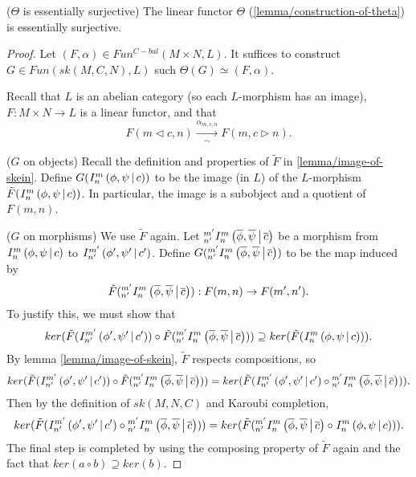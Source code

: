 \begin{lemma}\label{lemma/theta-is-essentially-surjective} ($\Theta$ is essentially surjective)
  The linear functor $\Theta$ (\ref{lemma/construction-of-theta}) is essentially surjective.
\end{lemma}

\begin{proof}
  Let $(F, \alpha) \in Fun^{C-bal}(M \times N, L)$. It suffices to construct $G \in Fun(sk(M,C,N), L)$ such $\Theta(G) \simeq (F,\alpha)$.

  Recall that $L$ is an abelian category (so each $L$-morphism has an image),
  $F: M \times N \to L$ is a linear functor, and that
  \[
    F(m \lhd c, n) \xrightarrow[\sim]{\alpha_{m,c,n}} F(m, c \rhd n).
  \]

  \noindent ($G$ on objects) Recall the definition and properties of
  $\tilde{F}$ in \ref{lemma/image-of-skein}. Define
  $G({}^{}_{} I^{m}_{n} \left( \phi, \psi \,\middle|\, c \right))$ to be the image (in $L$) of the
  $L$-morphism $\tilde{F}({}^{}_{} I^{m}_{n} \left( \phi, \psi \,\middle|\, c \right))$. In particular, the
  image is a subobject and a quotient of $F(m,n)$.

  \noindent ($G$ on morphisms) We use $\tilde{F}$ again. Let
  ${}^{m'}_{n'} I^{m}_{n} \left( \overline{\phi}, \overline{\psi} \,\middle|\, \overline{c} \right)$ be a
  morphism from ${}^{}_{} I^{m}_{n} \left( \phi, \psi \,\middle|\, c \right)$ to
  ${}^{}_{} I^{m'}_{n'} \left( \phi', \psi' \,\middle|\, c' \right)$. Define
  $G({}^{m'}_{n'} I^{m}_{n} \left( \overline{\phi}, \overline{\psi} \,\middle|\, \overline{c} \right))$ to be
  the map induced by
  \[
    \tilde{F}({}^{m'}_{n'} I^{m}_{n} \left( \overline{\phi}, \overline{\psi} \,\middle|\, \overline{c} \right)): F(m,n) \to F(m',n').
  \]
  To justify this, we must show that
  \[
    ker(
    \tilde{F}({}^{}_{} I^{m'}_{n'} \left( \phi', \psi' \,\middle|\, c' \right))
    \circ
    \tilde{F}({}^{m'}_{n'} I^{m}_{n} \left( \overline{\phi}, \overline{\psi} \,\middle|\, \overline{c} \right))
    )
    \supseteq
    ker(\tilde{F}({}^{}_{} I^{m}_{n} \left( \phi, \psi \,\middle|\, c \right))).
  \]
  By lemma \ref{lemma/image-of-skein}, $\tilde{F}$ respects compositions, so
  \[
    ker(
    \tilde{F}({}^{}_{} I^{m'}_{n'} \left( \phi', \psi' \,\middle|\, c' \right))
    \circ
    \tilde{F}({}^{m'}_{n'} I^{m}_{n} \left( \overline{\phi}, \overline{\psi} \,\middle|\, \overline{c} \right))
    )
    =
    ker(
    \tilde{F}({}^{}_{} I^{m'}_{n'} \left( \phi', \psi' \,\middle|\, c' \right)
    \circ
    {}^{m'}_{n'} I^{m}_{n} \left( \overline{\phi}, \overline{\psi} \,\middle|\, \overline{c} \right))
    ).
  \]
  Then by the definition of $sk(M,N,C)$ and Karoubi completion,
  \[
    ker(
    \tilde{F}({}^{}_{} I^{m'}_{n'} \left( \phi', \psi' \,\middle|\, c' \right)
    \circ
    {}^{m'}_{n'} I^{m}_{n} \left( \overline{\phi}, \overline{\psi} \,\middle|\, \overline{c} \right))
    )
    =
    ker(
    \tilde{F}(
    {}^{m'}_{n'} I^{m}_{n} \left( \overline{\phi}, \overline{\psi} \,\middle|\, \overline{c} \right)
    \circ
    {}^{}_{} I^{m}_{n} \left( \phi, \psi \,\middle|\, c \right)
    )
    ).
  \]
  The final step is completed by using the composing property of $\tilde{F}$ again and the fact that
  $ker(a \circ b) \supseteq ker(b)$.
\end{proof}

